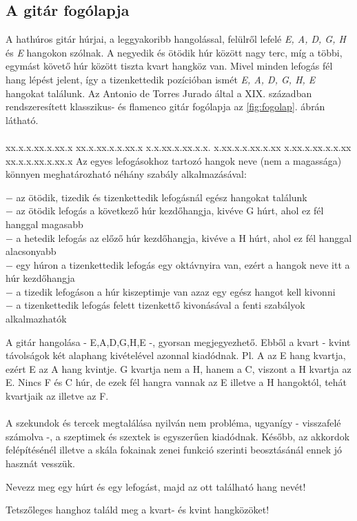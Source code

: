 \subsection{A gitár fogólapja}
\label{sec:gitarfogolap}
A hathúros gitár húrjai, a leggyakoribb hangolással, felülről lefelé \textit{E, A, D, G, H} és \textit{E} hangokon szólnak. A negyedik és ötödik húr között nagy terc, míg a többi, egymást követő húr között tiszta kvart hangköz van. Mivel minden lefogás fél hang lépést jelent, így a tizenkettedik pozícióban ismét \textit{E, A, D, G, H, E} hangokat találunk. Az Antonio de Torres Jurado által a XIX. században rendszeresített klasszikus- és flamenco gitár fogólapja az \ref{fig:fogolap}. ábrán látható.\\\\
          {xx.x.x.xx.x.xx.x%
           xx.x.xx.x.x.xx.x%
           x.x.xx.x.xx.x.x.%
           x.xx.x.x.xx.x.xx%
           x.xx.x.xx.x.x.xx%
           xx.x.x.xx.x.xx.x}
Az egyes lefogásokhoz tartozó hangok neve (nem a magassága) könnyen meghatározható néhány szabály alkalmazásával:
\begin{pitemize}
$-$ az ötödik, tizedik és tizenkettedik lefogásnál egész hangokat találunk  \\
$-$ az ötödik lefogás a következő húr kezdőhangja, kivéve G húrt, ahol ez fél hanggal magasabb  \\
$-$ a hetedik lefogás az előző húr kezdőhangja, kivéve a H húrt, ahol ez fél hanggal alacsonyabb \\
$-$ egy húron a tizenkettedik lefogás egy oktávnyira van, ezért a hangok neve itt a húr kezdőhangja \\
$-$ a tizedik lefogáson a húr kiszeptimje van azaz egy egész hangot kell kivonni \\
$-$ a tizenkettedik lefogás felett tizenkettő kivonásával a fenti szabályok alkalmazhatók \\
\end{pitemize}
A gitár hangolása - E,A,D,G,H,E -, gyorsan megjegyezhető. Ebből a kvart - kvint távolságok két alaphang kivételével azonnal kiadódnak. Pl. A az E hang kvartja, ezért E az A hang kvintje. G kvartja nem a H, hanem a C, viszont a H kvartja az E. Nincs F és C húr, de ezek fél hangra vannak az E illetve a H hangoktól, tehát kvartjaik az \aisz illetve az F. \\\\
A szekundok és tercek megtalálása nyilván nem probléma, ugyanígy - visszafelé számolva -, a szeptimek és szextek is egyszerűen kiadódnak. Később, az akkordok felépítésénél illetve a skála fokainak zenei funkció szerinti beosztásánál ennek jó hasznát vesszük.
\begin{practices}
\item Nevezz meg egy húrt és egy lefogást, majd az ott található hang nevét!
\item Tetszőleges hanghoz találd meg a kvart- és kvint hangközöket!
\end{practices}

